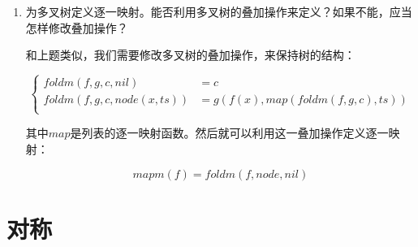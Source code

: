 \documentclass[UTF8]{article}
\begin{document}
\begin{enumerate}
\item 为多叉树定义逐一映射。能否利用多叉树的叠加操作来定义？如果不能，应当怎样修改叠加操作？

和上题类似，我们需要修改多叉树的叠加操作，来保持树的结构：

\[
\begin{cases}
foldm(f, g, c, nil) & = c \\
foldm(f, g, c, node(x, ts)) & = g(f(x), map(foldm(f, g, c), ts)) \\
\end{cases}
\]

其中$map$是列表的逐一映射函数。然后就可以利用这一叠加操作定义逐一映射：

\[
mapm(f) = foldm(f, node, nil)
\]

\end{enumerate}

\section{对称}
\end{document}
